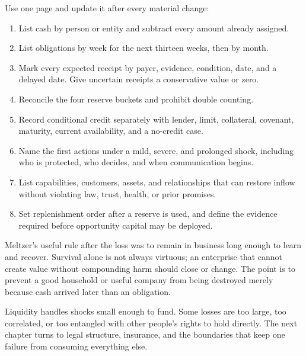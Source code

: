 Use one page and update it after every material change:

\begin{enumerate}[itemsep=0.13em]
\item List cash by person or entity and subtract every amount already assigned.
\item List obligations by week for the next thirteen weeks, then by month.
\item Mark every expected receipt by payer, evidence, condition, date, and a
  delayed date. Give uncertain receipts a conservative value or zero.
\item Reconcile the four reserve buckets and prohibit double counting.
\item Record conditional credit separately with lender, limit, collateral,
  covenant, maturity, current availability, and a no-credit case.
\item Name the first actions under a mild, severe, and prolonged shock,
  including who is protected, who decides, and when communication begins.
\item List capabilities, customers, assets, and relationships that can restore
  inflow without violating law, trust, health, or prior promises.
\item Set replenishment order after a reserve is used, and define the evidence
  required before opportunity capital may be deployed.
\end{enumerate}

Meltzer's useful rule after the loss was to remain in business long enough to
learn and recover. Survival alone is not always virtuous; an enterprise that
cannot create value without compounding harm should close or change. The point
is to prevent a good household or useful company from being destroyed merely
because cash arrived later than an obligation.

Liquidity handles shocks small enough to fund. Some losses are too large, too
correlated, or too entangled with other people's rights to hold directly. The
next chapter turns to legal structure, insurance, and the boundaries that keep
one failure from consuming everything else.
